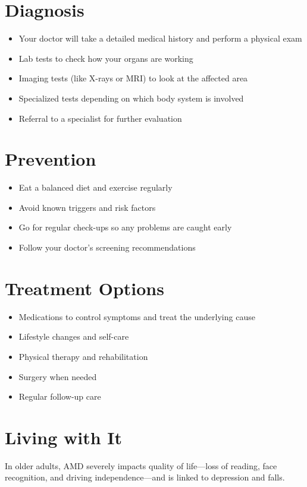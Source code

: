 \section{Diagnosis}

\begin{itemize}[noitemsep]
  \item Your doctor will take a detailed medical history and perform a physical exam
  \item Lab tests to check how your organs are working
  \item Imaging tests (like X-rays or MRI) to look at the affected area
  \item Specialized tests depending on which body system is involved
  \item Referral to a specialist for further evaluation
\end{itemize}

\section{Prevention}

\begin{itemize}[noitemsep]
  \item Eat a balanced diet and exercise regularly
  \item Avoid known triggers and risk factors
  \item Go for regular check-ups so any problems are caught early
  \item Follow your doctor's screening recommendations
\end{itemize}

\section{Treatment Options}

\begin{itemize}[noitemsep]
  \item Medications to control symptoms and treat the underlying cause
  \item Lifestyle changes and self-care
  \item Physical therapy and rehabilitation
  \item Surgery when needed
  \item Regular follow-up care
\end{itemize}

\section{Living with It}
In older adults, AMD severely impacts quality of life---loss of reading, face recognition, and driving independence---and is linked to depression and falls.

